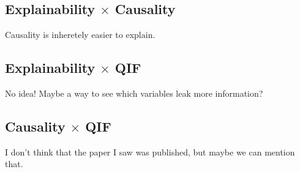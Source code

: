 \subsection{Explainability $\times$ Causality}

{\color{red} Causality is inheretely easier to explain.}

\subsection{Explainability $\times$ QIF}

{\color{red} No idea! Maybe a way to see which variables leak more information?}

\subsection{Causality $\times$ QIF}

{\color{red} I don't think that the paper I saw was published, but maybe we can mention that.}

